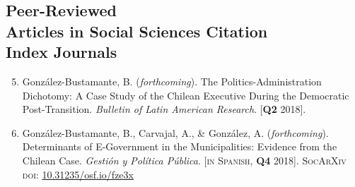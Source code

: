\documentclass[letterpaper,margin]{res}
\newenvironment{benumerate}[1]{
    \let\oldItem\item
    \def\item{\addtocounter{enumi}{-2}\oldItem}
    \begin{enumerate}
    \setcounter{enumi}{#1}
    \addtocounter{enumi}{1}
}{
    \end{enumerate}
}
\begin{document}
\begin{resume}




\section{\footnotesize Peer-Reviewed \\ Articles in Social Sciences Citation \\ Index Journals}


\begin{benumerate}{4}
\item{\small Gonz\'alez-Bustamante, B. ({\itshape forthcoming}). The Politics-Administration Dichotomy: A Case Study of the Chilean Executive During the Democratic Post-Transition. {\itshape Bulletin of Latin American Research}. {\footnotesize \scshape [{\bfseries \small Q2} 2018]}.}\vspace{1mm}

\item{\small Gonz\'alez-Bustamante, B., Carvajal, A., \& Gonz\'alez, A. ({\itshape forthcoming}). Determinants of E-Government in the Municipalities: Evidence from the Chilean Case. {\itshape Gesti\'on y Pol\'itica P\'ublica}. {\footnotesize \scshape [in Spanish, {\bfseries \small Q4} 2018]}. {\scshape {\footnotesize SocArXiv} doi}: \href{https://doi.org/10.31235/osf.io/fze3x}{10.31235/osf.io/fze3x}}\vspace{1mm}


\end{benumerate}
\end{resume}
\end{document}
